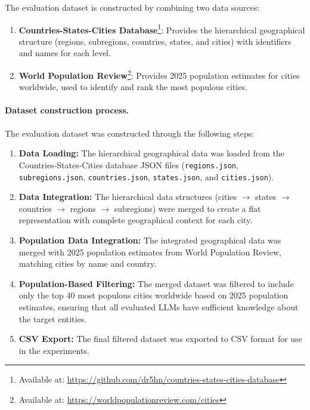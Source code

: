 \documentclass[letterpaper]{article} %
\begin{document}
The evaluation dataset is constructed by combining two data sources:

\begin{enumerate}
    \item \textbf{Countries-States-Cities Database}\footnote{Available at: \url{https://github.com/dr5hn/countries-states-cities-database}}: Provides the hierarchical geographical structure (regions, subregions, countries, states, and cities) with identifiers and names for each level.
    \item \textbf{World Population Review}\footnote{Available at: \url{https://worldpopulationreview.com/cities}}: Provides 2025 population estimates for cities worldwide, used to identify and rank the most populous cities.
\end{enumerate}

\paragraph{Dataset construction process.} The evaluation dataset was constructed through the following steps:

\begin{enumerate}
    \item \textbf{Data Loading:} The hierarchical geographical data was loaded from the Countries-States-Cities database JSON files (\texttt{regions.json}, \texttt{subregions.json}, \texttt{countries.json}, \texttt{states.json}, and \texttt{cities.json}).
    \item \textbf{Data Integration:} The hierarchical data structures (cities $\rightarrow$ states $\rightarrow$ countries $\rightarrow$ regions $\rightarrow$ subregions) were merged to create a flat representation with complete geographical context for each city.
    \item \textbf{Population Data Integration:} The integrated geographical data was merged with 2025 population estimates from World Population Review, matching cities by name and country.
    \item \textbf{Population-Based Filtering:} The merged dataset was filtered to include only the top 40 most populous cities worldwide based on 2025 population estimates, ensuring that all evaluated LLMs have sufficient knowledge about the target entities.
    \item \textbf{CSV Export:} The final filtered dataset was exported to CSV format for use in the experiments.
\end{enumerate}
\end{document}
